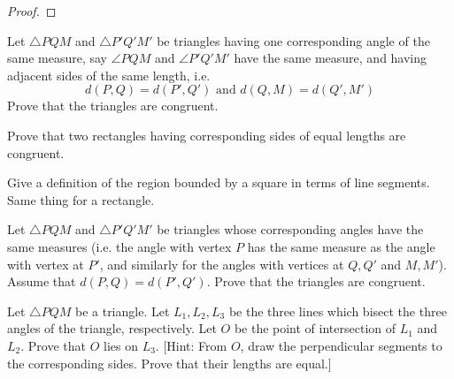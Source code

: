 \begin{proof}
    
\end{proof}

\begin{tcolorbox}[title=Problem 7, breakable]
    Let $\triangle PQM$ and $\triangle P'Q'M'$ be triangles 
        having one corresponding angle of the same measure,
        say $\angle PQM$ and $\angle P'Q'M'$ have the same measure,
        and having adjacent sides of the same length, i.e.
        \[d(P, Q) = d(P', Q') \text{ and } d(Q, M) = d(Q', M')\]
        Prove that the triangles are congruent.
\end{tcolorbox}

\begin{tcolorbox}[title=Problem 8, breakable]
    Prove that two rectangles having corresponding sides 
        of equal lengths are congruent.
\end{tcolorbox}

\begin{tcolorbox}[title=Problem 9, breakable]
    Give a definition of the region bounded by a square in terms of line 
        segments. Same thing for a rectangle.
\end{tcolorbox}

\begin{tcolorbox}[title=Problem 11, breakable]
    Let $\triangle PQM$ and $\triangle P'Q'M'$ be triangles whose corresponding
        angles have the same measures (i.e. the angle with vertex $P$ has the same 
        measure as the angle with vertex at $P'$, and similarly for the angles with
        vertices at $Q, Q'$ and $M, M'$). Assume that $d(P, Q) = d(P', Q')$.
    Prove that the triangles are congruent.
\end{tcolorbox}

\begin{tcolorbox}[title=Problem 12, breakable]
    Let $\triangle PQM$ be a triangle. 
    Let $L_1, L_2, L_3$ be the three lines which bisect 
        the three angles of the triangle, respectively.
    Let $O$ be the point of intersection of $L_1$ and $L_2$.
    Prove that $O$ lies on $L_3$.
    [Hint: From $O$, draw the perpendicular segments to the corresponding sides. 
     Prove that their lengths are equal.]
\end{tcolorbox}